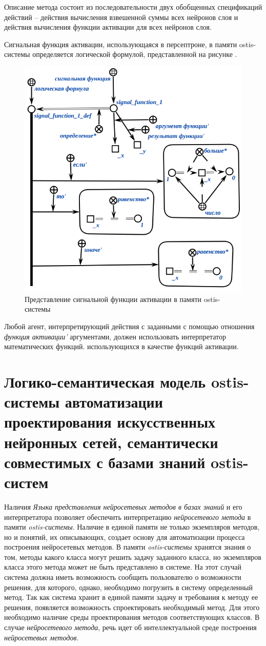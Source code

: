 Описание метода состоит из последовательности двух обобщенных спецификаций действий -- действия вычисления взвешенной суммы всех нейронов слоя и действия вычисления функции активации для всех нейронов слоя.

Сигнальная функция активации, использующаяся в персептроне, в памяти ostis-системы определяется логической формулой, представленной на рисунке \textit{}.

\begin{figure}
	\centering
	\includegraphics[width=0.5\linewidth]{author/part3/figures/signal_function_def.png}
	\caption{Представление сигнальной функции активации в памяти ostis-системы}
	\label{fig:signal_function_def}
\end{figure}

Любой агент, интерпретирующий действия с заданными с помощью отношения \textit{функция активации'} аргументами, должен использовать интерпретатор математических функций. использующихся в качестве функций активации.


\section{Логико-семантическая модель ostis-системы автоматизации проектирования искусственных нейронных сетей, семантически совместимых с базами знаний ostis-систем}
\label{sec_chapter_ann_framework}

Наличия \textit{Языка представления нейросетевых методов в базах знаний} и его интерпретатора позволяет обеспечить интерпретацию \textit{нейросетевого метода} в памяти \textit{ostis-системы}. Наличие в единой памяти не только экземпляров методов, но и понятий, их описывающих, создает основу для автоматизации процесса построения нейросетевых методов. В памяти \textit{ostis-системы} хранятся знания о том, методы какого класса могут решить задачу заданного класса, но экземпляров класса этого метода может не быть представлено в системе. На этот случай система должна иметь возможность сообщить пользователю о возможности решения, для которого, однако, необходимо погрузить в систему определенный метод. Так как система хранит в единой памяти задачу и требования к методу ее решения, появляется возможность спроектировать необходимый метод. Для этого необходимо наличие среды проектирования методов соответствующих классов. В случае \textit{нейросетевого метода}, речь идет об интеллектуальной среде построения \textit{нейросетевых методов}.

